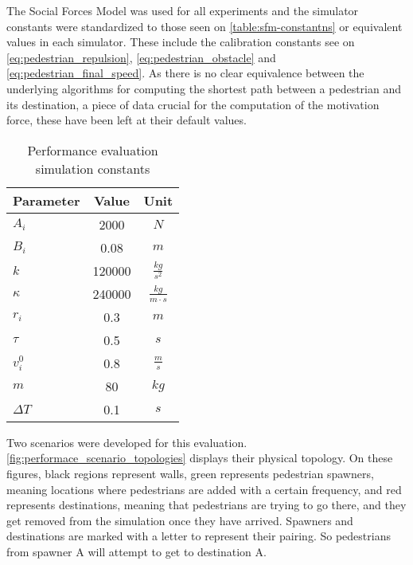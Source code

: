 \documentclass[twoside, 11pt]{article}
\begin{document}
The Social Forces Model was used for all experiments and the simulator constants were standardized to those seen on \autoref{table:sfm-constantns} or equivalent values in each simulator. These include the calibration constants see on \autoref{eq:pedestrian_repulsion}, \autoref{eq:pedestrian_obstacle} and \autoref{eq:pedestrian_final_speed}. As there is no clear equivalence between the underlying algorithms for computing the shortest path between a pedestrian and its destination, a piece of data crucial for the computation of the motivation force, these have been left at their default values.

\begin{table}[h]
  \begin{center}
    \begin{tabular}{ | l | c | c | } 
      \hline
      Parameter & Value & Unit\\ 
      \hline 
      $A_i$ & 2000 & $N$\\
      \hline
      $B_i$ & 0.08 & $m$\\
      \hline
      $k$ & 120000 & $\frac{kg}{s^2}$\\
      \hline
      $\kappa$ & 240000 & $\frac{kg}{m \cdot s}$\\
      \hline
      $r_i$ & 0.3 & $m$\\
      \hline
      $\tau$ & 0.5 & $s$\\
      \hline
      $v_i^0$ & 0.8 & $\frac{m}{s}$\\
      \hline
      $m$ & 80 & $kg$\\
      \hline
      $\Delta T$ & 0.1 & $s$\\
      \hline 
    \end{tabular}
    \caption{Performance evaluation simulation constants}
    \label{table:sfm-constantns}
  \end{center}
\end{table}

Two scenarios were developed for this evaluation. \autoref{fig:performace_scenario_topologies} displays their physical topology. On these figures, black regions represent walls, green represents pedestrian spawners, meaning locations where pedestrians are added with a certain frequency, and red represents destinations, meaning that pedestrians are trying to go there, and they get removed from the simulation once they have arrived. Spawners and destinations are marked with a letter to represent their pairing. So pedestrians from spawner A will attempt to get to destination A.
\end{document}
